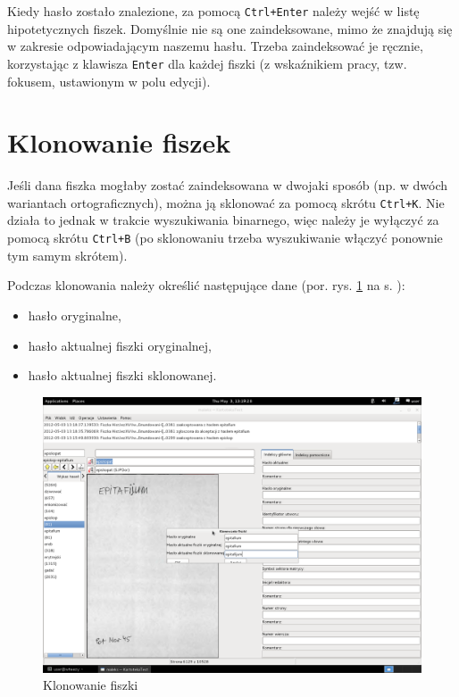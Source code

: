 \documentclass[12pt,oneside,notitlepage,titleauthor]{mwart}%
\begin{document}
Kiedy hasło zostało znalezione, za pomocą \texttt{Ctrl+Enter} należy wejść w listę hipotetycznych fiszek. Domyślnie nie są one zaindeksowane, mimo że znajdują się w zakresie odpowiadającym naszemu hasłu. Trzeba zaindeksować je ręcznie, korzystając z klawisza \texttt{Enter} dla każdej fiszki (z wskaźnikiem pracy, tzw. fokusem, ustawionym w polu edycji).



\section{Klonowanie fiszek}
Jeśli dana fiszka mogłaby zostać zaindeksowana w dwojaki sposób (np. w dwóch wariantach ortograficznych), można ją sklonować za pomocą skrótu \texttt{Ctrl+K}. Nie działa to jednak w trakcie wyszukiwania binarnego, więc należy je wyłączyć za pomocą skrótu \texttt{Ctrl+B} (po sklonowaniu trzeba wyszukiwanie włączyć ponownie tym samym skrótem).


Podczas klonowania należy określić następujące dane (por. rys. \ref{08klonowanie}  na s. \pageref{08klonowanie}):

\begin{itemize}

\item hasło oryginalne,

\item hasło aktualnej fiszki oryginalnej,

\item hasło aktualnej fiszki sklonowanej.
\end{itemize}

\begin{figure}[h]
\includegraphics[scale=0.3]{08klonowanie.png}
\caption{Klonowanie fiszki}
\label{08klonowanie}
\end{figure}
\end{document}
